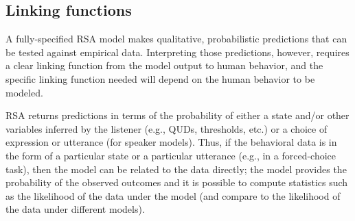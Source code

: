 \documentclass{sp}
\begin{document}
\subsection{Linking functions}

A fully-specified RSA model makes qualitative, probabilistic predictions that can be tested against empirical data.
Interpreting those predictions, however, requires a clear linking function from the model output to human behavior, and the specific linking function needed will depend on the human behavior to be modeled.


RSA returns predictions in terms of the probability of either a state and/or other variables inferred by the listener (e.g., QUDs, thresholds, etc.) or a choice of expression or utterance (for speaker models).
Thus, if the behavioral data is in the form of a particular state or a particular utterance (e.g., in a forced-choice task), then the model can be related to the data directly; the model provides the probability of the observed outcomes and it is possible to compute statistics such as the likelihood of the data under the model (and compare to the likelihood of the data under different models). 
\end{document}
